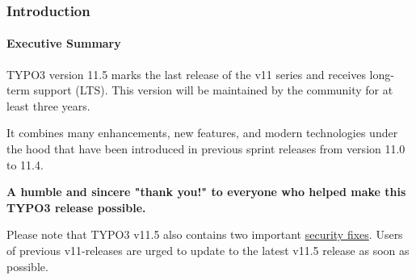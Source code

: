 %

\begin{frame}[fragile]
	\frametitle{Introduction}
	\framesubtitle{Executive Summary}

	\small

		TYPO3 version 11.5 marks the last release of the v11 series and receives
		long-term support (LTS). This version will be maintained by the
		community for at least three years.

		\vspace{0.2cm}

		It combines many enhancements, new features, and modern technologies
		under the hood that have been introduced in previous sprint releases
		from version 11.0 to 11.4.

		\vspace{0.2cm}

%

		\textbf{A humble and sincere "thank you!" to everyone who helped make this TYPO3 release possible.}

		\vspace{0.2cm}

		Please note that TYPO3 v11.5 also contains two important
		\href{https://typo3.org/help/security-advisories/typo3-cms}{security fixes}.
		Users of previous v11-releases are urged to update to the latest v11.5
		release as soon as possible.

	\normalsize

\end{frame}

